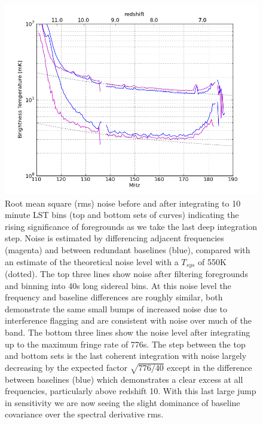 \documentclass[preprint]{aastex}
\begin{document}
\begin{figure}
\centering
\includegraphics[width=\textwidth]{figures/psa32_trms_with_and_without_fr_filtering_z.png}
\caption{\label{fig:noise} Root mean square (rms) noise before and after integrating to 10 minute LST bins (top and bottom sets of curves) indicating the rising significance of foregrounds as we take the last deep integration step. Noise is estimated by differencing adjacent frequencies (magenta) and between redundant baselines (blue), compared with an estimate of the theoretical noise level with a $T_{sys}$ of 550K (dotted). The top three lines show noise after filtering foregrounds and binning into 40s long sidereal bins.  At this noise level the frequency and baseline differences are roughly similar, both demonstrate the same small bumps of increased noise due to interference flagging and are consistent with noise over much of the band.  The bottom three lines show the noise level after integrating up to the maximum fringe rate of 776s. The step between the top and bottom sets is the last coherent integration with noise largely decreasing by the expected factor $\sqrt{776/40}$ except in the difference between baselines (blue) which demonstrates a clear excess at all frequencies, particularly above redshift 10. With this last large jump in sensitivity we are now seeing the slight dominance of baseline covariance over the spectral derivative rms. }
\end{figure}
\end{document}

